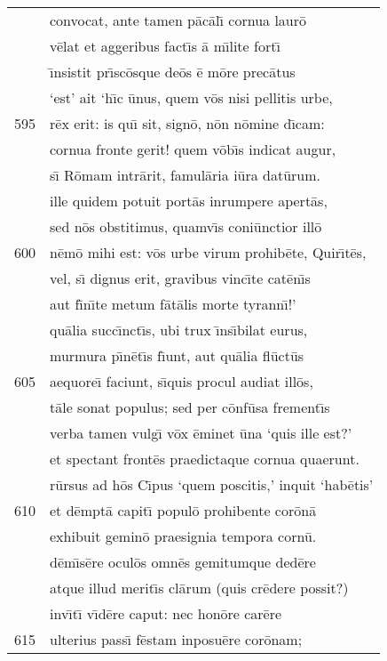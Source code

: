 \documentclass[paper=6in:9in,pagesize=pdftex,
               headinclude=on,footinclude=on,12pt]{scrbook}
\begin{document}
\begin{longtable}[p]{ r l }
 & convocat, ante tamen p\=ac\=al\={\i} cornua laur\=o\\ 
 & v\=elat et aggeribus fact\={\i}s \=a m\={\i}lite fort\={\i}\\ 
 & \={\i}nsistit pr\={\i}sc\=osque de\=os \=e m\=ore prec\=atus\\ 
 & `est' ait `h\={\i}c \=unus, quem v\=os nisi pellitis urbe,\\ 
595 & r\=ex erit: is qu\={\i} sit, sign\=o, n\=on n\=omine d\={\i}cam:\\ 
 & cornua fronte gerit! quem v\=ob\={\i}s indicat augur,\\ 
 & s\={\i} R\=omam intr\=arit, famul\=aria i\=ura dat\=urum.\\ 
 & ille quidem potuit port\=as inrumpere apert\=as,\\ 
 & sed n\=os obstitimus, quamv\={\i}s coni\=unctior ill\=o\\ 
600 & n\=em\=o mihi est: v\=os urbe virum prohib\=ete, Quir\={\i}t\=es,\\ 
 & vel, s\={\i} dignus erit, gravibus vinc\={\i}te cat\=en\={\i}s\\ 
 & aut f\={\i}n\={\i}te metum f\=at\=alis morte tyrann\={\i}!'\\ 
 & qu\=alia succ\={\i}nct\={\i}s, ubi trux \={\i}ns\={\i}bilat eurus,\\ 
 & murmura p\={\i}n\=et\={\i}s f\={\i}unt, aut qu\=alia fl\=uct\=us\\ 
605 & aequore\={\i} faciunt, s\={\i}quis procul audiat ill\=os,\\ 
 & t\=ale sonat populus; sed per c\=onf\=usa frement\={\i}s\\ 
 & verba tamen vulg\={\i} v\=ox \=eminet \=una `quis ille est?'\\ 
 & et spectant front\=es praedictaque cornua quaerunt.\\ 
 & r\=ursus ad h\=os C\={\i}pus `quem poscitis,' inquit `hab\=etis'\\ 
610 & et d\=empt\=a capit\={\i} popul\=o prohibente cor\=on\=a\\ 
 & exhibuit gemin\=o praesignia tempora corn\=u.\\ 
 & d\=em\={\i}s\=ere ocul\=os omn\=es gemitumque ded\=ere\\ 
 & atque illud merit\={\i}s cl\=arum (quis cr\=edere possit?)\\ 
 & inv\={\i}t\={\i} v\={\i}d\=ere caput: nec hon\=ore car\=ere\\ 
615 & ulterius pass\={\i} f\=estam inposu\=ere cor\=onam;\\ 

\end{longtable}
\end{document}

